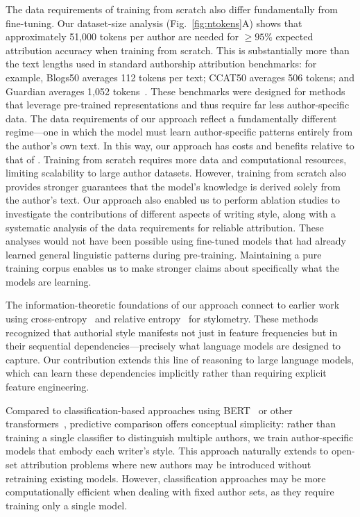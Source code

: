 \documentclass[11pt]{article}
\begin{document}
The data requirements of training from scratch also differ fundamentally from
fine-tuning. Our dataset-size analysis (Fig.~\ref{fig:ntokens}A) shows that
approximately 51,000 tokens per author are needed for $\geq 95\%$ expected
attribution accuracy when training from scratch. This is substantially more
than the text lengths used in standard authorship attribution benchmarks: for
example, Blogs50 averages 112 tokens per text; CCAT50 averages 506 tokens; and
Guardian averages 1,052 tokens~\citep{HuanEtal25}. These benchmarks were
designed for methods that leverage pre-trained representations and thus require
far less author-specific data. The data requirements of our approach reflect a
fundamentally different regime---one in which the model must learn
author-specific patterns entirely from the author's own text. In this way, our
approach has costs and benefits relative to that of \citet{HuanEtal25}.
Training from scratch requires more data and computational resources, limiting
scalability to large author datasets. However, training from scratch also
provides stronger guarantees that the model's knowledge is derived solely from
the author's text. Our approach also enabled us to perform ablation studies to
investigate the contributions of different aspects of writing style, along with
a systematic analysis of the data requirements for reliable attribution. These
analyses would not have been possible using fine-tuned models that had already learned
general linguistic patterns during pre-training. Maintaining a pure training
corpus enables us to make stronger claims about specifically what the models
are learning.

The information-theoretic foundations of our approach connect to earlier work
using cross-entropy~\citep{JuolBaay05} and relative entropy~\citep{ZhaoEtal06}
for stylometry. These methods recognized that authorial style manifests not
just in feature frequencies but in their sequential dependencies---precisely
what language models are designed to capture. Our contribution extends this
line of reasoning to large language models, which can learn these dependencies
implicitly rather than requiring explicit feature engineering.

Compared to classification-based approaches using BERT~\citep{FabiEtal20} or
other transformers~\citep{UcheEtal20}, predictive comparison offers conceptual
simplicity: rather than training a single classifier to distinguish multiple
authors, we train author-specific models that embody each writer's style. This
approach naturally extends to open-set attribution problems where new authors
may be introduced without retraining existing models. However, classification
approaches may be more computationally efficient when dealing with fixed author
sets, as they require training only a single model.
\end{document}
